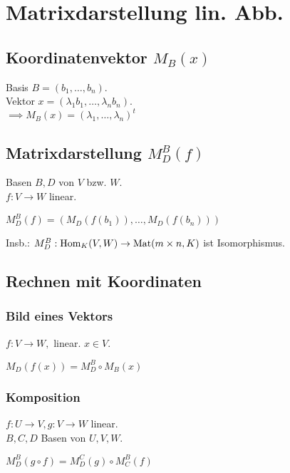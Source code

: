 \section*{Matrixdarstellung lin. Abb.}

\subsection*{Koordinatenvektor $M_B(x)$}
Basis $B=(b_1,\dots,b_n)$.\\
Vektor $x=(\lambda_1 b_1,\dots,\lambda_n b_n)$. \\
$\implies M_B(x) = (\lambda_1,\dots,\lambda_n)^t$

\subsection*{Matrixdarstellung $M_D^B(f)$}
Basen $B,D$ von $V$ bzw. $W$. \\
$f:V\to W$ linear.

$M_D^B(f)=(M_D(f(b_1)),\dots,M_D(f(b_n)))$

Insb.: $M_D^B: \operatorname{Hom}_K(V,W) \to \operatorname{Mat}(m \times n, K)$
ist Isomorphismus.

\subsection*{Rechnen mit Koordinaten}
\subsubsection*{Bild eines Vektors}
$f: V\to W, $ linear. $x\in V$.

$M_D(f(x))=M_D^B \circ M_B(x)$

\subsubsection*{Komposition}
$f: U\to V, g: V\to W$ linear. \\
$B,C,D$ Basen von $U,V,W$.

$M_D^B(g \circ f) = M_D^C(g) \circ M^B_C(f)$
